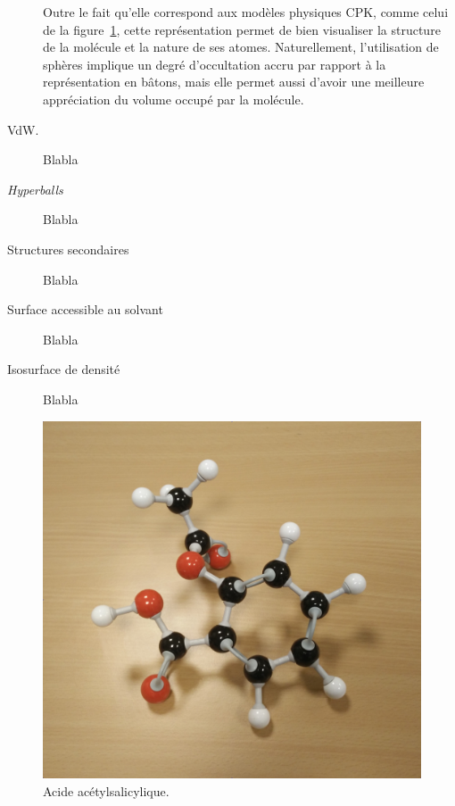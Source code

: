 \begin{description}
		Outre le fait qu'elle correspond aux modèles physiques CPK, comme celui de la figure~\ref{fig:aspirin}, cette représentation permet de bien visualiser la structure de la molécule et la nature de ses atomes. Naturellement, l'utilisation de sphères implique un degré d'occultation accru par rapport à la représentation en bâtons, mais elle permet aussi d'avoir une meilleure appréciation du volume occupé par la molécule.
		
		
		
		\item[VdW.] Blabla
		\item[\emph{Hyperballs}] Blabla
		\item[Structures secondaires] Blabla
		\item[Surface accessible au solvant] Blabla
		\item[Isosurface de densité] Blabla
	\end{description}
	
	\begin{figure}[H]
		\centering
		\includegraphics[width=\textwidth]{figures/ch1/aspirin}
		\caption{Acide acétylsalicylique.}
		\label{fig:aspirin}
	\end{figure}
	
	
	
